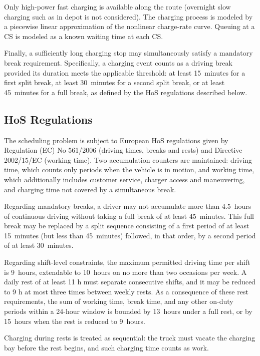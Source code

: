 \documentclass[preprint,12pt,3p]{elsarticle}
\begin{document}
Only high-power fast charging is available along the route (overnight slow charging such as in depot is not considered). The charging process is modeled by a piecewise linear approximation of the nonlinear charge-rate curve. Queuing at a CS is modeled as a known waiting time at each CS.

Finally, a sufficiently long charging stop may simultaneously satisfy a mandatory break requirement. Specifically, a charging event counts as a driving break provided its duration meets the applicable threshold: at least 15~minutes for a first split break, at least 30~minutes for a second split break, or at least 45~minutes for a full break, as defined by the HoS regulations described below.

\subsection{HoS Regulations}
The scheduling problem is subject to European HoS regulations given by Regulation (EC) No 561/2006 (driving times, breaks and rests) and Directive 2002/15/EC (working time).
Two accumulation counters are maintained: driving time, which counts only periods when the vehicle is in motion, and working time, which additionally includes customer service, charger access and maneuvering, and charging time not covered by a simultaneous break.

Regarding mandatory breaks, a driver may not accumulate more than 4.5~hours of continuous driving without taking a full break of at least 45~minutes. This full break may be replaced by a split sequence consisting of a first period of at least 15~minutes (but less than 45~minutes) followed, in that order, by a second period of at least 30~minutes.

Regarding shift-level constraints, the maximum permitted driving time per shift is 9~hours, extendable to 10~hours on no more than two occasions per week.
A daily rest of at least 11 h must separate consecutive shifts, and it may be reduced to 9 h at most three times between weekly rests.
As a consequence of these rest requirements, the sum of working time, break time, and any other on-duty periods within a 24-hour window is bounded by 13~hours under a full rest, or by 15~hours when the rest is reduced to 9~hours.

Charging during rests is treated as sequential: the truck must vacate the charging bay before the rest begins, and such charging time counts as work.
\end{document}
